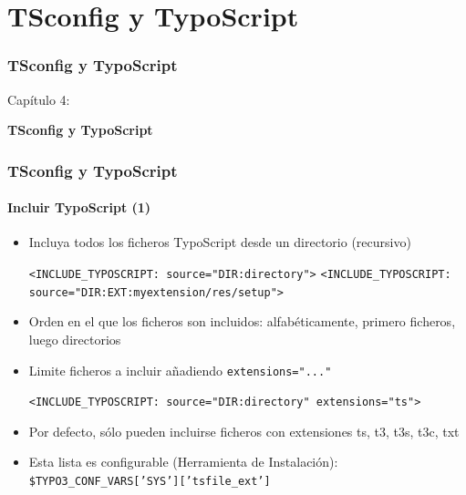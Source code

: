 %

\section{TSconfig y TypoScript}
\begin{frame}[fragile]
	\frametitle{TSconfig y TypoScript}

	\begin{center}\huge{Capítulo 4:}\end{center}
	\begin{center}\huge{\color{typo3darkgrey}\textbf{TSconfig y TypoScript}}\end{center}

\end{frame}


\begin{frame}[fragile]
	\frametitle{TSconfig y TypoScript}
	\framesubtitle{Incluir TypoScript (1)}

	\begin{itemize}
		\item Incluya todos los ficheros TypoScript desde un directorio (recursivo)

			\lstinline!<INCLUDE_TYPOSCRIPT: source="DIR:directory">!
			\lstinline!<INCLUDE_TYPOSCRIPT: source="DIR:EXT:myextension/res/setup">!

		\item Orden en el que los ficheros son incluidos:\newline
			alfabéticamente, primero ficheros, luego directorios
		\item Limite ficheros a incluir añadiendo \texttt{extensions="..."}

			\lstinline!<INCLUDE_TYPOSCRIPT: source="DIR:directory" extensions="ts">!

		\item Por defecto, sólo pueden incluirse ficheros con extensiones ts, t3, t3s, t3c, txt
		\item Esta lista es configurable (Herramienta de Instalación):\newline
			\texttt{\$TYPO3\_CONF\_VARS['SYS']['tsfile\_ext']}
	\end{itemize}

\end{frame}

